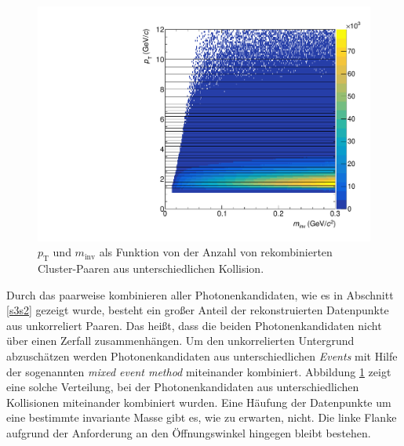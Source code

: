 \begin{figure}[tp]
\centering
\includegraphics[width=.7\linewidth]{hInvMass_pT_Bkg.pdf}
\caption{$p_\text{T}$ und $m_\text{inv}$ als Funktion von der Anzahl von rekombinierten  Cluster-Paaren aus unterschiedlichen Kollision.}
\label{figInvMassPt_b}
\end{figure}
Durch das paarweise kombinieren aller Photonenkandidaten, wie es in Abschnitt \ref{s3s2} gezeigt wurde, besteht ein großer Anteil der rekonstruierten Datenpunkte aus unkorreliert Paaren.
Das heißt, dass die beiden Photonenkandidaten nicht über einen Zerfall zusammenhängen.
Um den unkorrelierten Untergrund abzuschätzen werden Photonenkandidaten aus unterschiedlichen \textit{Events} mit Hilfe der sogenannten \textit{mixed event method} miteinander kombiniert.
Abbildung \ref{figInvMassPt_b} zeigt eine solche Verteilung, bei der Photonenkandidaten aus unterschiedlichen Kollisionen miteinander kombiniert wurden.
Eine Häufung der Datenpunkte um eine bestimmte invariante Masse gibt es, wie zu erwarten, nicht.
Die linke Flanke aufgrund der Anforderung an den Öffnungswinkel hingegen bleibt bestehen.
\newline
